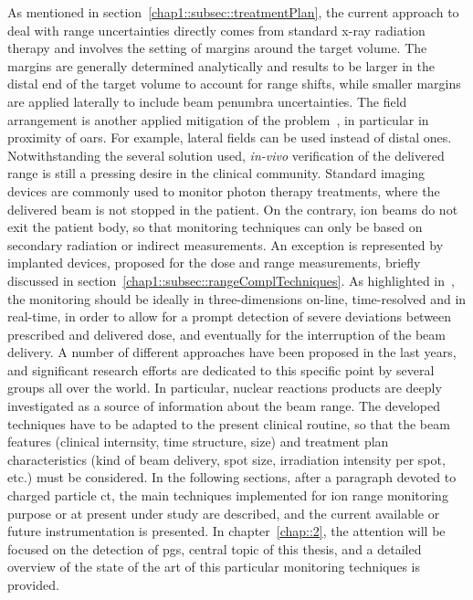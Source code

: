 As mentioned in section~\ref{chap1::subsec::treatmentPlan}, the current approach to deal with range uncertainties directly comes from standard x-ray radiation therapy and involves the setting of margins around the target volume. The margins are generally determined analytically and results to be larger in the distal end of the target volume to account for range shifts, while smaller margins are applied laterally to include beam penumbra uncertainties. The field arrangement is another applied mitigation of the problem~\parencite{Lomax2001}, in particular in proximity of \glspl{oar}. For example, lateral fields can be used instead of distal ones. 
Notwithstanding the several solution used, \textit{in-vivo} verification of the delivered range is still a pressing desire in the clinical community. Standard imaging devices are commonly used to monitor photon therapy treatments, where the delivered beam is not stopped in the patient. On the contrary, ion beams do not exit the patient body, so that monitoring techniques can only be based on secondary radiation or indirect measurements. An exception is represented by implanted devices, proposed for the dose and range measurements, briefly discussed in section~\ref{chap1::subsec::rangeComplTechniques}.
As highlighted in~\cite{Parodi2015}, the monitoring should be ideally in three-dimensions on-line, time-resolved and in real-time, in order to allow for a prompt detection of severe deviations between prescribed and delivered dose, and eventually for the interruption of the beam delivery. A number of different approaches have been proposed in the last years, and significant research efforts are dedicated to this specific point by several groups all over the world. In particular, nuclear reactions products are deeply investigated as a source of information about the beam range. The developed techniques have to be adapted to the present clinical routine, so that the beam features (clinical internsity, time structure, size) and treatment plan characteristics (kind of beam delivery, spot size, irradiation intensity per spot, etc.) must be considered. In the following sections, after a paragraph devoted to charged particle \gls{ct}, the main techniques implemented for ion range monitoring purpose or at present under study are described, and the current available or future instrumentation is presented. In chapter~\ref{chap::2}, the attention will be focused on the detection of \glspl{pg}, central topic of this thesis, and a detailed overview of the state of the art of this particular monitoring techniques is provided.                


